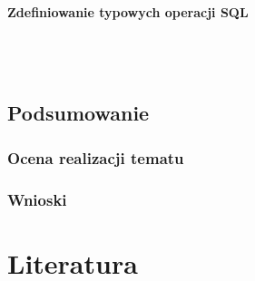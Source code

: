 \documentclass[polish, 11pt]{article}
\begin{document}
		    \paragraph{Zdefiniowanie typowych operacji SQL}\mbox{}\\\\

    \subsection{Podsumowanie}
	    \subsubsection{Ocena realizacji tematu}
	    
		\subsubsection{Wnioski}

\section{Literatura}
\end{document}
